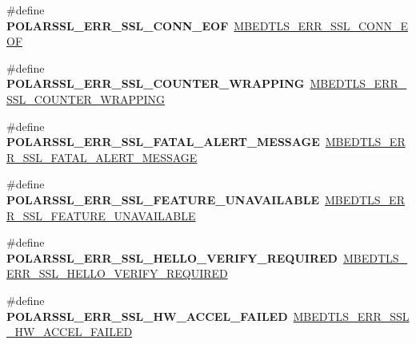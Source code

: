 \begin{DoxyCompactItemize}
\item 
\mbox{\label{compat-1_83_8h_a28bfc80f65337b0dbd4b006e53274b32}} 
\#define {\bfseries P\+O\+L\+A\+R\+S\+S\+L\+\_\+\+E\+R\+R\+\_\+\+S\+S\+L\+\_\+\+C\+O\+N\+N\+\_\+\+E\+OF}~\mbox{\hyperlink{ssl_8h_ab82e0253b53fa62fab94b98ef9eb97f9}{M\+B\+E\+D\+T\+L\+S\+\_\+\+E\+R\+R\+\_\+\+S\+S\+L\+\_\+\+C\+O\+N\+N\+\_\+\+E\+OF}}
\item 
\mbox{\label{compat-1_83_8h_a3802ace7255386bfbe71925823fc9931}} 
\#define {\bfseries P\+O\+L\+A\+R\+S\+S\+L\+\_\+\+E\+R\+R\+\_\+\+S\+S\+L\+\_\+\+C\+O\+U\+N\+T\+E\+R\+\_\+\+W\+R\+A\+P\+P\+I\+NG}~\mbox{\hyperlink{ssl_8h_ae8cfe8ffb3e7448e6097a7601b349ac5}{M\+B\+E\+D\+T\+L\+S\+\_\+\+E\+R\+R\+\_\+\+S\+S\+L\+\_\+\+C\+O\+U\+N\+T\+E\+R\+\_\+\+W\+R\+A\+P\+P\+I\+NG}}
\item 
\mbox{\label{compat-1_83_8h_a5cb8a175a1f0c3b3fe77f26fd32abda2}} 
\#define {\bfseries P\+O\+L\+A\+R\+S\+S\+L\+\_\+\+E\+R\+R\+\_\+\+S\+S\+L\+\_\+\+F\+A\+T\+A\+L\+\_\+\+A\+L\+E\+R\+T\+\_\+\+M\+E\+S\+S\+A\+GE}~\mbox{\hyperlink{ssl_8h_acc37a34787c5c5484a993ff64c3a1634}{M\+B\+E\+D\+T\+L\+S\+\_\+\+E\+R\+R\+\_\+\+S\+S\+L\+\_\+\+F\+A\+T\+A\+L\+\_\+\+A\+L\+E\+R\+T\+\_\+\+M\+E\+S\+S\+A\+GE}}
\item 
\mbox{\label{compat-1_83_8h_a39e027ae9b490271b7c7b0e7bd4ec9a6}} 
\#define {\bfseries P\+O\+L\+A\+R\+S\+S\+L\+\_\+\+E\+R\+R\+\_\+\+S\+S\+L\+\_\+\+F\+E\+A\+T\+U\+R\+E\+\_\+\+U\+N\+A\+V\+A\+I\+L\+A\+B\+LE}~\mbox{\hyperlink{ssl_8h_aea8b7e95c7e547959c10e9cad5f46043}{M\+B\+E\+D\+T\+L\+S\+\_\+\+E\+R\+R\+\_\+\+S\+S\+L\+\_\+\+F\+E\+A\+T\+U\+R\+E\+\_\+\+U\+N\+A\+V\+A\+I\+L\+A\+B\+LE}}
\item 
\mbox{\label{compat-1_83_8h_abe8142da70fb62e96b0e0112f0adb28c}} 
\#define {\bfseries P\+O\+L\+A\+R\+S\+S\+L\+\_\+\+E\+R\+R\+\_\+\+S\+S\+L\+\_\+\+H\+E\+L\+L\+O\+\_\+\+V\+E\+R\+I\+F\+Y\+\_\+\+R\+E\+Q\+U\+I\+R\+ED}~\mbox{\hyperlink{ssl_8h_a18d6936a834082004d1b1d16fe0007a2}{M\+B\+E\+D\+T\+L\+S\+\_\+\+E\+R\+R\+\_\+\+S\+S\+L\+\_\+\+H\+E\+L\+L\+O\+\_\+\+V\+E\+R\+I\+F\+Y\+\_\+\+R\+E\+Q\+U\+I\+R\+ED}}
\item 
\mbox{\label{compat-1_83_8h_a5241d228f234e307b60bc13139eab2fc}} 
\#define {\bfseries P\+O\+L\+A\+R\+S\+S\+L\+\_\+\+E\+R\+R\+\_\+\+S\+S\+L\+\_\+\+H\+W\+\_\+\+A\+C\+C\+E\+L\+\_\+\+F\+A\+I\+L\+ED}~\mbox{\hyperlink{ssl_8h_aef773c241760a00e92c239a917e4868e}{M\+B\+E\+D\+T\+L\+S\+\_\+\+E\+R\+R\+\_\+\+S\+S\+L\+\_\+\+H\+W\+\_\+\+A\+C\+C\+E\+L\+\_\+\+F\+A\+I\+L\+ED}}

\end{DoxyCompactItemize}
